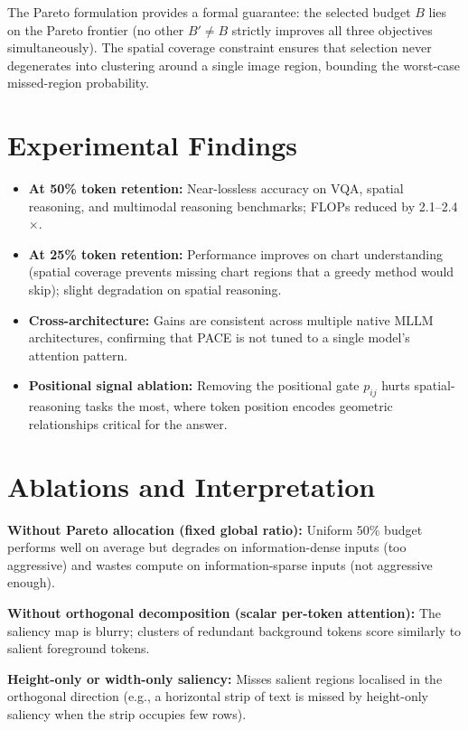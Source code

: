 \documentclass[10pt,twocolumn]{article}
\begin{document}
The Pareto formulation provides a formal guarantee: the selected budget
$B$ lies on the Pareto frontier (no other $B' \neq B$ strictly improves
all three objectives simultaneously). The spatial coverage constraint ensures
that selection never degenerates into clustering around a single image region,
bounding the worst-case missed-region probability.

\section{Experimental Findings}

\begin{itemize}[itemsep=2pt,parsep=0pt]
  \item \textbf{At 50\% token retention:} Near-lossless accuracy on VQA,
    spatial reasoning, and multimodal reasoning benchmarks; FLOPs reduced
    by 2.1--2.4$\times$.
  \item \textbf{At 25\% token retention:} Performance improves on chart
    understanding (spatial coverage prevents missing chart regions that
    a greedy method would skip); slight degradation on spatial reasoning.
  \item \textbf{Cross-architecture:} Gains are consistent across multiple
    native MLLM architectures, confirming that PACE is not tuned to a
    single model's attention pattern.
  \item \textbf{Positional signal ablation:} Removing the positional gate
    $p_{ij}$ hurts spatial-reasoning tasks the most, where token position
    encodes geometric relationships critical for the answer.
\end{itemize}

\section{Ablations and Interpretation}

\textbf{Without Pareto allocation (fixed global ratio):} Uniform 50\%
budget performs well on average but degrades on information-dense inputs
(too aggressive) and wastes compute on information-sparse inputs (not
aggressive enough).

\textbf{Without orthogonal decomposition (scalar per-token attention):}
The saliency map is blurry; clusters of redundant background tokens score
similarly to salient foreground tokens.

\textbf{Height-only or width-only saliency:} Misses salient regions
localised in the orthogonal direction (e.g., a horizontal strip of text
is missed by height-only saliency when the strip occupies few rows).
\end{document}
